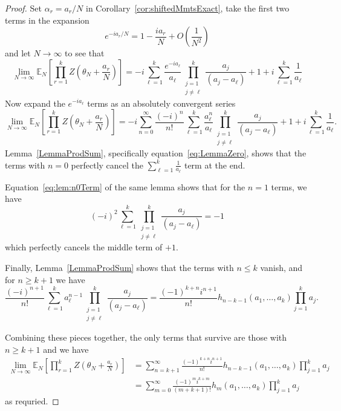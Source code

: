 \documentclass[12pt,a4paper,reqno]{amsart}
\theoremstyle{remark}
\numberwithin{equation}{section}
\newcommand{\E}{\mathbb{E}}
\begin{document}
\begin{proof}
    Set $\alpha_r = a_r/N$ in Corollary~\ref{cor:shiftedMmtsExact}, take the first two terms in the  expansion
    \[
    e^{-ia_r / N} = 1 - \frac{i a_r}{N} + O\left(\frac{1}{N^2}\right)
    \]
    and let $N\to\infty$ to see that
\[
\lim_{N \to \infty} \E_N\left[ \prod_{r=1}^k Z\left(\theta_N+\frac{a_r}{N}\right) \right]
= -i \sum_{\ell=1}^{k} \frac{e^{-i a_\ell} }{a_\ell} \prod_{\substack{j=1 \\ j \neq \ell}}^{k} \frac{a_j}{(a_j-a_\ell)} + 1 + i \sum_{\ell=1}^k \frac{1}{a_\ell}
\]
Now expand the $e^{-i a_\ell}$ terms as an absolutely convergent series
\[
\lim_{N \to \infty} \E_N\left[ \prod_{r=1}^k Z\left(\theta_N+\frac{a_r}{N}\right) \right]
= -i \sum_{n=0}^\infty \frac{(-i)^n}{n!}\sum_{\ell=1}^{k} \frac{a_\ell^n }{a_\ell} \prod_{\substack{j=1 \\ j \neq \ell}}^{k} \frac{a_j}{(a_j-a_\ell)} + 1 + i \sum_{\ell=1}^k \frac{1}{a_\ell}.
\]
Lemma~\ref{LemmaProdSum}, specifically equation~\eqref{eq:LemmaZero}, shows that the terms with $n=0$ perfectly cancel the $\sum_{\ell=1}^k \frac{1}{a_\ell}$ term at the end.

Equation~\eqref{eq:lem:n0Term} of the same lemma shows that for the $n=1$ terms, we have
\[
(-i)^2 \sum_{\ell=1}^k \prod_{\substack{j=1 \\ j\neq \ell}}^k \frac{a_j}{(a_j-a_\ell)} = -1
\]
which perfectly cancels the middle term of $+1$.

Finally, Lemma~\ref{LemmaProdSum} shows that the terms with $n \leq k$ vanish, and for $n \geq k+1$ we have
\begin{equation*}
\frac{(-i)^{n+1}}{n!} \sum_{\ell=1}^k a_\ell^{n-1} \prod_{\substack{j=1 \\ j\neq \ell}}^k  \frac{a_j}{(a_j-a_\ell)} = \frac{(-1)^{k+n} i^{n+1}}{n!} h_{n-k-1}(a_1,\dots,a_k) \prod_{j=1}^k a_j.
\end{equation*}

Combining these pieces together, the only terms that survive are those with $n\geq k+1$ and we have
\begin{align*}
\lim_{N \to \infty} \E_N\left[ \prod_{r=1}^k Z\left(\theta_N+\frac{a_r}{N}\right) \right]
&=  \sum_{n=k+1}^\infty \frac{(-1)^{k+n} i^{n+1}}{n!} h_{n-k-1}(a_1,\dots,a_k) \prod_{j=1}^k a_j \\
&=  \sum_{m=0}^\infty \frac{(-1)^{m} i^{k+m}}{(m+k+1)!} h_{m}(a_1,\dots,a_k)   \prod_{j=1}^k a_j
\end{align*}
as requried.
\end{proof}
\end{document}
